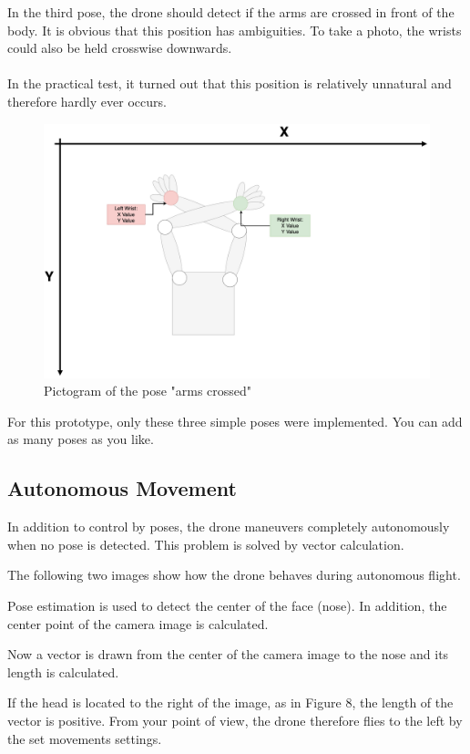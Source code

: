 \documentclass[a4paper,11pt,singlespacing]{article}
\begin{document}
In the third pose, the drone should detect if the arms are crossed in front of the body.
It is obvious that this position has ambiguities. To take a photo, the wrists could also be 
held crosswise downwards.
\\\\
In the practical test, it turned out that this position is relatively 
unnatural and therefore hardly ever occurs.

\begin{figure}[H]
	\centering
	\includegraphics[width=\textwidth]{images/arms_crossed.png}
	\caption{Pictogram of the pose "arms crossed"}
	\label{arms_crossed}
\end{figure}

For this prototype, only these three simple poses were implemented. 
You can add as many poses as you like. 

\subsection{Autonomous Movement}

In addition to control by poses, the drone maneuvers completely autonomously when no pose is detected.
This problem is solved by vector calculation.

The following two images show how the drone behaves during autonomous flight.

Pose estimation is used to detect the center of the face (nose). In addition, the center point of the camera image is calculated.

Now a vector is drawn from the center of the camera image to the nose and its length is calculated.

If the head is located to the right of the image, as in Figure 8, the length of the vector is positive. 
From your point of view, the drone therefore flies to the left by the set movements settings.
\end{document}
